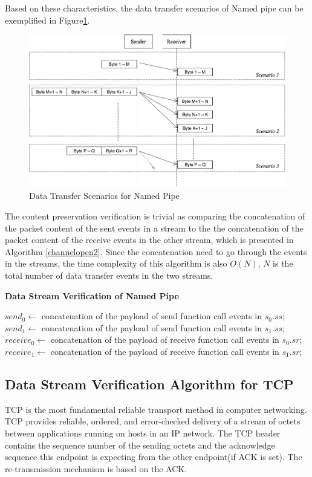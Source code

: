 Based on these characteristics, the data transfer scenarios of Named pipe can be exemplified in Figure\ref{namedpipe}. 
\begin{figure}[H]
\centerline{\includegraphics[scale=0.4]{Figures/namedpipe}}
\caption{Data Transfer Scenarios for Named Pipe}
\label{namedpipe}
\end{figure}

The content preservation verification is trivial as comparing the concatenation of the packet content of the sent events in a stream to the the concatenation of the packet content of the receive events in the other stream, which is presented in Algorithm \ref{channelopen2}. Since the concatenation need to go through the events in the streams, the time complexity of this algorithm is also $O(N)$, $N$ is the total number of data transfer events in the two streams.

\begin{algorithm}[H]
\DontPrintSemicolon
\caption{{\bf Data Stream Verification of Named Pipe} \label{dataAlg1}}
\;
$send_0 \leftarrow$ concatenation of the payload of send function call events in $s_0.ss$;\;
$send_1 \leftarrow$ concatenation of the payload of send function call events in $s_1.ss$;\;
$receive_0 \leftarrow$ concatenation of the payload of receive function call events in $s_0.sr$;\;
$receive_1 \leftarrow$ concatenation of the payload of receive function call events in $s_1.sr$;\;
\end{algorithm} 

\subsection{Data Stream Verification Algorithm for TCP}
TCP is the most fundamental reliable transport method in computer networking. TCP provides reliable, ordered, and error-checked delivery of a stream of octets between applications running on hosts in an IP network. The TCP header contains the sequence number of the sending octets and the acknowledge sequence this endpoint is expecting from the other endpoint(if ACK is set). The re-transmission mechanism is based on the ACK. 

